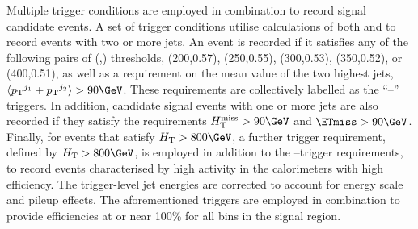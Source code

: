 Multiple trigger conditions are employed in combination to record
signal candidate events. A set of trigger conditions utilise
calculations of both \scalht and \alphat to record events with two or
more jets. An event is recorded if it satisfies any of the following
pairs of (\scalht,\alphat) thresholds, (200,0.57), (250,0.55),
(300,0.53), (350,0.52), or (400,0.51), as well as a requirement on the
mean value of the two highest \Pt jets, $\langle\Pt^{j_\text{1}} +
\Pt^{j_\text{2}}\rangle > 90\GeV$. These requirements are collectively
labelled as the ``\scalht--\alphat'' triggers. In addition, candidate
signal events with one or more jets are also recorded if they satisfy
the requirements $\HTmiss > 90\GeV$ and $\ETmiss > 90\GeV$. Finally,
for events that satisfy $\scalht > 800\GeV$, a further trigger
requirement, defined by $\scalht > 800\GeV$, is employed in addition
to the \scalht--\alphat trigger requirements, to record events
characterised by high activity in the calorimeters with high
efficiency. The trigger-level jet energies are corrected to account
for energy scale and pileup effects. The aforementioned triggers are
employed in combination to provide efficiencies at or near 100\% for
all bins in the signal region.

